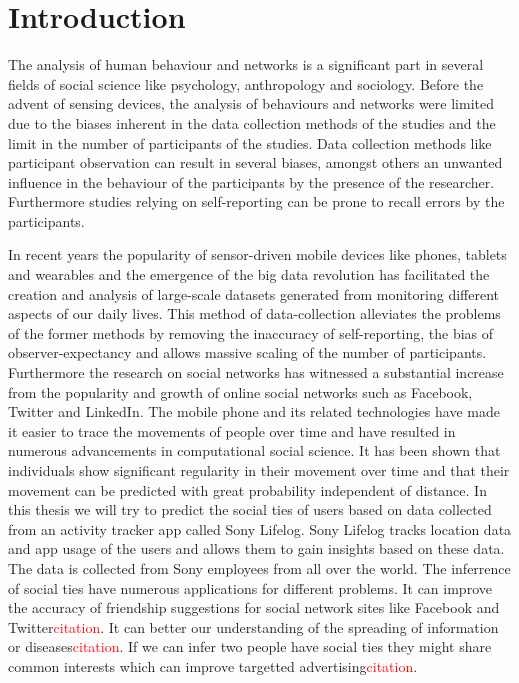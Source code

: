 \chapter{Introduction}
The analysis of human behaviour and networks is a significant part in several fields of social science like psychology, anthropology and sociology. Before the advent of sensing devices, the analysis of behaviours and networks were limited due to the biases inherent in the data collection methods of the studies and the limit in the number of participants of the studies. Data collection methods like participant observation can result in several biases, amongst others an unwanted influence in the behaviour of the participants by the presence of the researcher\cite{rosenthal1966experimenter}. Furthermore studies relying on self-reporting can be prone to recall errors by the participants\cite{stone1999science}.

In recent years the popularity of sensor-driven mobile devices like phones, tablets and wearables and the emergence of the big data revolution has facilitated the creation and analysis of large-scale datasets generated from monitoring different aspects of our daily lives\cite{lazer2009life}. This method of data-collection alleviates the problems of the former methods by removing the inaccuracy of self-reporting, the bias of observer-expectancy and allows massive scaling of the number of participants. Furthermore the research on social networks has witnessed a substantial increase from the popularity and growth of online social networks such as Facebook, Twitter and LinkedIn\cite{social_networks}. The mobile phone and its related technologies have made it easier to trace the movements of people over time and have resulted in numerous advancements in computational social science. It has been shown that individuals show significant regularity in their movement over time\cite{Uihmp} and that their movement can be predicted with great probability independent of distance\cite{LoPiHM}. In this thesis we will try to predict the social ties of users based on data collected from an activity tracker app called Sony Lifelog\cite{sonyLifeLog}. Sony Lifelog tracks location data and app usage of the users and allows them to gain insights based on these data. The data is collected from Sony employees from all over the world.
The inferrence of social ties have numerous applications for different problems. It can improve the accuracy of friendship suggestions for social network sites like Facebook and Twitter\textcolor{red}{citation}. It can better our understanding of the spreading of information or diseases\textcolor{red}{citation}. If we can infer two people have social ties they might share common interests which can improve targetted advertising\textcolor{red}{citation}.

